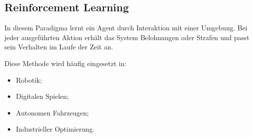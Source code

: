 \subsection{Reinforcement Learning}

In diesem Paradigma lernt ein Agent durch Interaktion mit einer Umgebung. Bei jeder ausgeführten
Aktion erhält das System Belohnungen oder Strafen und passt sein Verhalten im Laufe der
Zeit an.

Diese Methode wird häufig eingesetzt in:

\begin{itemize}
    \item Robotik;
    \item Digitalen Spielen;
    \item Autonomen Fahrzeugen;
    \item Industrieller Optimierung.
\end{itemize} 